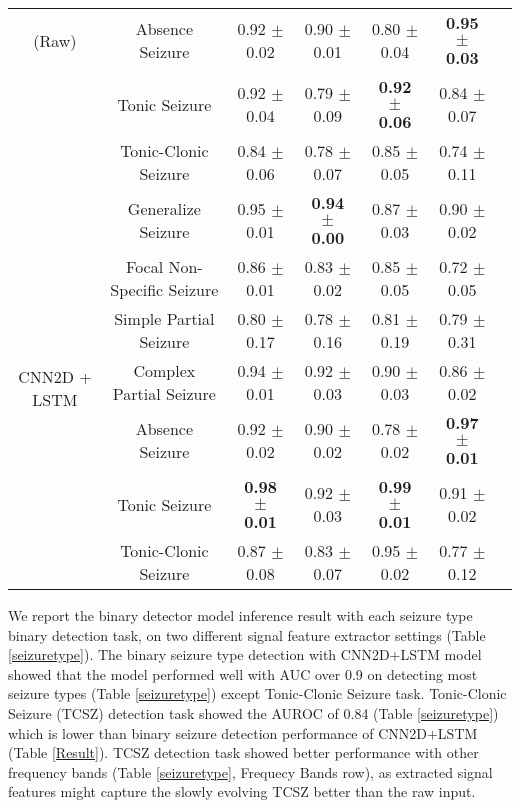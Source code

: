 \documentclass[pmlr,twocolumn,10pt]{jmlr}
\begin{document}
\begin{table*}[ht!]
\begin{tabular}{c|c|ccccc}
		(Raw)
		&Absence Seizure 
		& 0.92 $\pm$ 0.02 
		& 0.90 $\pm$ 0.01 
		& 0.80 $\pm$ 0.04 
		& \textbf{0.95 $\pm$ 0.03 }
		\\
		&Tonic Seizure 
		& 0.92 $\pm$ 0.04 
		& 0.79 $\pm$ 0.09
		& \textbf{0.92 $\pm$ 0.06 }
		& 0.84 $\pm$ 0.07 
		\\
		&Tonic-Clonic Seizure 
		& 0.84 $\pm$ 0.06 
		& 0.78 $\pm$ 0.07 
		& 0.85 $\pm$ 0.05 
		& 0.74 $\pm$ 0.11 
		\\
		\midrule
		\multirow{7}{*}{CNN2D + LSTM}
		& Generalize Seizure 
		& 0.95 $\pm$ 0.01
		& \textbf{0.94 $\pm$ 0.00}
		& 0.87 $\pm$ 0.03
		& 0.90 $\pm$ 0.02 
		\\
		&Focal Non-Specific Seizure 
		& 0.86 $\pm$ 0.01
		& 0.83 $\pm$ 0.02 
		& 0.85 $\pm$ 0.05 
		& 0.72 $\pm$ 0.05 
		\\
		&Simple Partial Seizure 
		& 0.80 $\pm$ 0.17 
		& 0.78 $\pm$ 0.16
		& 0.81 $\pm$ 0.19
		& 0.79 $\pm$ 0.31
		\\
		&Complex Partial Seizure 
		& 0.94 $\pm$ 0.01
		& 0.92 $\pm$ 0.03
		& 0.90 $\pm$ 0.03
		& 0.86 $\pm$ 0.02
		\\
		(Frequency Bands)
		&Absence Seizure 
		& 0.92 $\pm$ 0.02
		& 0.90 $\pm$ 0.02
		& 0.78 $\pm$ 0.02
		& \textbf{0.97 $\pm$ 0.01}
		\\
		&Tonic Seizure 
		& \textbf{0.98 $\pm$ 0.01} 
		& 0.92 $\pm$ 0.03
		& \textbf{0.99 $\pm$ 0.01}
		& 0.91 $\pm$ 0.02
		\\
		&Tonic-Clonic Seizure 
		& 0.87 $\pm$ 0.08
		& 0.83 $\pm$ 0.07
		& 0.95 $\pm$ 0.02
		& 0.77 $\pm$ 0.12
		\\
		\bottomrule
	\end{tabular}
\end{table*} We report the binary detector model inference result with each seizure type binary detection task, on two different signal feature extractor settings (Table \ref{seizuretype}). The binary seizure type detection with CNN2D+LSTM model showed that the model performed well with AUC over 0.9 on detecting most seizure types (Table \ref{seizuretype}) except Tonic-Clonic Seizure task. Tonic-Clonic Seizure (TCSZ) detection task showed the AUROC of 0.84 (Table \ref{seizuretype}) which is lower than binary seizure detection performance of CNN2D+LSTM (Table \ref{Result}). TCSZ detection task showed better performance with other frequency bands (Table \ref{seizuretype}, Frequecy Bands row), as extracted signal features might capture the slowly evolving TCSZ better than the raw input. 
\end{document}
